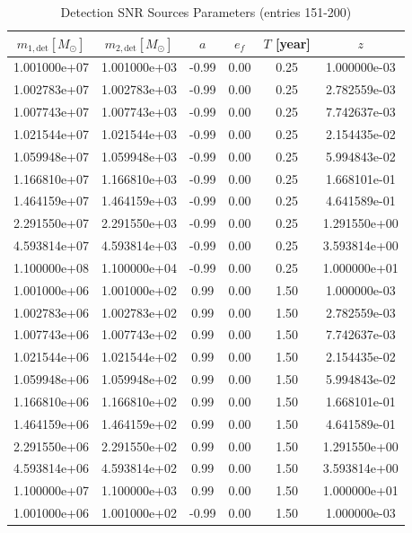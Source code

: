 \documentclass{article}
\begin{document}
\clearpage

\begin{table}[htbp]
\centering
\caption{Detection SNR Sources Parameters (entries 151-200)}
\label{tab:snr_sources_4}
\begin{tabular}{cccccc}
\hline
$m_{1,\mathrm{det}} [M_\odot]$ & $m_{2,\mathrm{det}} [M_\odot]$ & $a$ & $e_f$ & $T$ [year] & $z$ \\
\hline
1.001000e+07 & 1.001000e+03 & -0.99 & 0.00 & 0.25 & 1.000000e-03 \\
1.002783e+07 & 1.002783e+03 & -0.99 & 0.00 & 0.25 & 2.782559e-03 \\
1.007743e+07 & 1.007743e+03 & -0.99 & 0.00 & 0.25 & 7.742637e-03 \\
1.021544e+07 & 1.021544e+03 & -0.99 & 0.00 & 0.25 & 2.154435e-02 \\
1.059948e+07 & 1.059948e+03 & -0.99 & 0.00 & 0.25 & 5.994843e-02 \\
1.166810e+07 & 1.166810e+03 & -0.99 & 0.00 & 0.25 & 1.668101e-01 \\
1.464159e+07 & 1.464159e+03 & -0.99 & 0.00 & 0.25 & 4.641589e-01 \\
2.291550e+07 & 2.291550e+03 & -0.99 & 0.00 & 0.25 & 1.291550e+00 \\
4.593814e+07 & 4.593814e+03 & -0.99 & 0.00 & 0.25 & 3.593814e+00 \\
1.100000e+08 & 1.100000e+04 & -0.99 & 0.00 & 0.25 & 1.000000e+01 \\
1.001000e+06 & 1.001000e+02 & 0.99 & 0.00 & 1.50 & 1.000000e-03 \\
1.002783e+06 & 1.002783e+02 & 0.99 & 0.00 & 1.50 & 2.782559e-03 \\
1.007743e+06 & 1.007743e+02 & 0.99 & 0.00 & 1.50 & 7.742637e-03 \\
1.021544e+06 & 1.021544e+02 & 0.99 & 0.00 & 1.50 & 2.154435e-02 \\
1.059948e+06 & 1.059948e+02 & 0.99 & 0.00 & 1.50 & 5.994843e-02 \\
1.166810e+06 & 1.166810e+02 & 0.99 & 0.00 & 1.50 & 1.668101e-01 \\
1.464159e+06 & 1.464159e+02 & 0.99 & 0.00 & 1.50 & 4.641589e-01 \\
2.291550e+06 & 2.291550e+02 & 0.99 & 0.00 & 1.50 & 1.291550e+00 \\
4.593814e+06 & 4.593814e+02 & 0.99 & 0.00 & 1.50 & 3.593814e+00 \\
1.100000e+07 & 1.100000e+03 & 0.99 & 0.00 & 1.50 & 1.000000e+01 \\
1.001000e+06 & 1.001000e+02 & -0.99 & 0.00 & 1.50 & 1.000000e-03 \\

\end{tabular}
\end{table}
\end{document}
